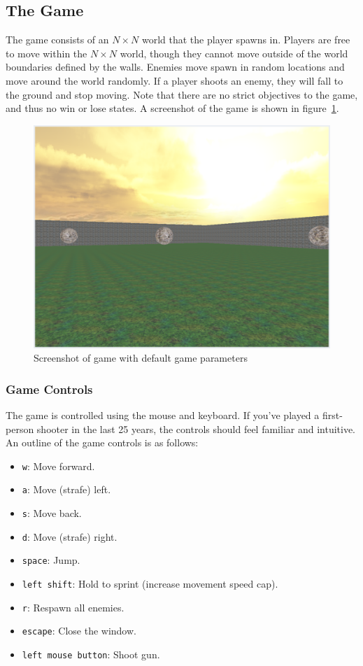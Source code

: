 \documentclass {article}
\begin{document}
\subsection{The Game}\label{sec:game}
The game consists of an $N \times N$ world that the player spawns in. Players are free to move within the $N \times N$ world, though they cannot move outside of the world boundaries defined by the walls. Enemies move spawn in random locations and move around the world randomly. If a player shoots an enemy, they will fall to the ground and stop moving. Note that there are no strict objectives to the game, and thus no win or lose states. A screenshot of the game is shown in figure~\ref{fig:game}.
\begin{figure}[H]
  \begin{center}
  \includegraphics[width=\textwidth]{game.png}
  \end{center}\caption{Screenshot of game with default game parameters}\label{fig:game}
\end{figure}

\subsubsection{Game Controls}\label{sec:controls}
The game is controlled using the mouse and keyboard. If you've played a first-person shooter in the last 25 years, the controls should feel familiar and intuitive. An outline of the game controls is as follows:
\begin{itemize}
  \item \texttt{w}: Move forward.
  \item \texttt{a}: Move (strafe) left.
  \item \texttt{s}: Move back.
  \item \texttt{d}: Move (strafe) right.
  \item \texttt{space}: Jump.
  \item \texttt{left shift}: Hold to sprint (increase movement speed cap).
  \item \texttt{r}: Respawn all enemies.
  \item \texttt{escape}: Close the window.
  \item \texttt{left mouse button}: Shoot gun.
\end{itemize}
\end{document}
